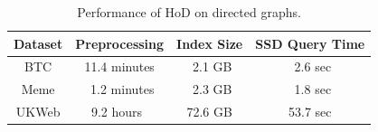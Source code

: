 \documentclass{sig-alternate}
\def\tblcapup{\vspace{-0mm}}
\def\tblcapdown{\vspace{-3mm}}
\def\tblup{\vspace{2mm}}
\def\GB{G_b}
\begin{document}
\begin{sloppy}
\begin{table} [t]
\centering
\begin{small}
\caption{Performance of HoD on directed graphs.}
\label{tbl:exp-directed}
\tblup
\begin{tabular}{| c | c | c | c | } \hline
{\bf Dataset} & {\bf Preprocessing} & {\bf Index Size} & {\bf SSD Query Time} \\ \hline
BTC & 11.4 minutes & $\;\,$2.1 GB & $\;\,$2.6 sec \\ \hline
Meme & $\;\,$1.2 minutes & $\;\,$2.3 GB & $\;\,$1.8 sec\\ \hline
UKWeb & 9.2 hours$\;\,$ & 72.6 GB & 53.7 sec \\ \hline
\end{tabular}
\tblcapdown
\end{small}
\end{table}

%
%
%
%


\end{sloppy}
\end{document}
